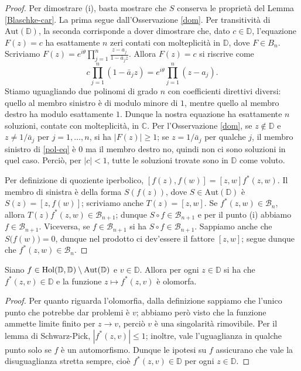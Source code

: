\begin{proof}
  Per dimostrare (i), basta mostrare che $S$ conserva le proprietà del Lemma \ref{Blaschke-car}. La prima segue dall'Osservazione \ref{dom}. Per transitività di $\text{Aut}(\mathbb{D})$, la seconda corrisponde a dover dimostrare che, dato $c \in \mathbb{D}$, l'equazione $F(z)=c$ ha esattamente $n$ zeri contati con molteplicità in $\mathbb{D}$, dove $F \in B_n$. Scriviamo $F(z)=\displaystyle e^{i\theta}\prod_{j=1}^n \frac{z-a_j}{1-\bar{a}_jz}$. Allora $F(z)=c$ si riscrive come
  \begin{equation} \label{pol-eq}
    c\prod_{j=1}^n (1-\bar{a}_jz)=e^{i\theta}\prod_{j=1}^n(z-a_j).
  \end{equation}
  Stiamo uguagliando due polinomi di grado $n$ con coefficienti direttivi diversi: quello al membro sinistro è di modulo minore di $1$, mentre quello al membro destro ha modulo esattamente $1$. Dunque la nostra equazione ha esattamente $n$ soluzioni, contate con molteplicità, in $\mathbb{C}$.
  Per l'Osservazione \ref{dom}, se $z \not\in \mathbb{D}$ e $z\not=1/\bar{a}_j$ per $j=1,\dots,n$, si ha $|F(z)| \ge 1$; se $z=1/\bar{a}_j$ per qualche $j$, il membro sinistro di \eqref{pol-eq} è $0$ ma il membro destro no, quindi non ci sono soluzioni in quel caso. Perciò, per $|c|<1$, tutte le soluzioni trovate sono in $\mathbb{D}$ come voluto.

  Per definizione di quoziente iperbolico, $[f(z),f(w)]=[z,w]f^*(z,w)$. Il membro di sinistra è della forma $S(f(z))$, dove $S \in \text{Aut}(\mathbb{D})$ è $S(z)=[z,f(w)]$; scriviamo anche $T(z)=[z,w]$.
  Se $f^*(z,w) \in \mathcal{B}_n$, allora $T(z)f^*(z,w) \in \mathcal{B}_{n+1}$; dunque $S\circ f \in \mathcal{B}_{n+1}$ e per il punto (i) abbiamo $f \in \mathcal{B}_{n+1}$. Viceversa, se $f \in \mathcal{B}_{n+1}$ si ha $S\circ f \in \mathcal{B}_{n+1}$.
  Sappiamo anche che $S\bigl(f(w)\bigr)=0$, dunque nel prodotto ci dev'essere il fattore $[z,w]$; segue dunque che $f^*(z,w) \in \mathcal{B}_n$.
\end{proof}

\begin{prop} \label{24}
  Siano $f \in \text{\normalfont{Hol}}(\mathbb{D},\mathbb{D})\setminus\text{\normalfont{Aut}}(\mathbb{D})$ e $v \in \mathbb{D}$. Allora per ogni $z \in \mathbb{D}$ si ha che $f^*(z,v) \in \mathbb{D}$ e la funzione $z \longmapsto f^*(z,v)$ è olomorfa.
\end{prop}

\begin{proof}
  Per quanto riguarda l'olomorfia, dalla definizione sappiamo che l'unico punto che potrebbe dar problemi è $v$; abbiamo però visto che la funzione ammette limite finito per $z \longrightarrow v$, perciò $v$ è una singolarità rimovibile. Per il lemma di Schwarz-Pick, $|f^*(z,v)| \le 1$; inoltre, vale l'uguaglianza in qualche punto solo se $f$ è un automorfismo. Dunque le ipotesi su $f$ assicurano che vale la disuguaglianza stretta sempre, cioè $f^*(z,v) \in \mathbb{D}$ per ogni $z \in \mathbb{D}$.
\end{proof}

